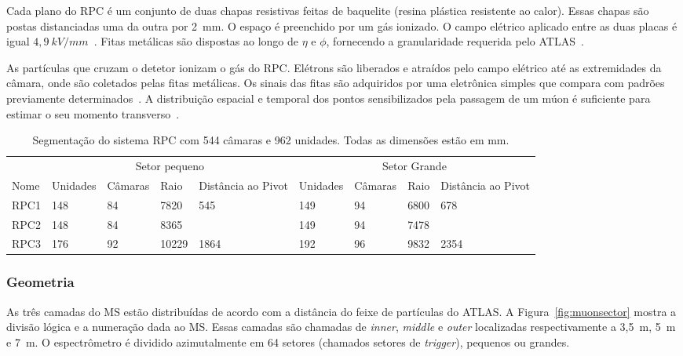 Cada plano do RPC é um conjunto de duas chapas resistivas feitas de baquelite
(resina plástica resistente ao calor). Essas chapas são postas distanciadas uma
da outra por 2~mm. O espaço é preenchido por um gás ionizado. O campo
elétrico aplicado entre as duas placas é igual $ 4,9~kV/mm$~\cite{ATLAS2008}.
Fitas metálicas são dispostas ao longo de $\eta$ e $\phi$, fornecendo a
granularidade requerida pelo ATLAS~\cite{MUONTDR1997, POLINI2012}.

As partículas que cruzam o detetor ionizam o gás do RPC. Elétrons são liberados
e atraídos pelo campo elétrico até as extremidades da câmara, onde são coletados
pelas fitas metálicas. Os sinais das fitas são adquiridos por uma eletrônica
simples que compara com padrões previamente determinados~\cite{MUONTDR1997}. A
distribuição espacial e temporal dos pontos sensibilizados pela passagem de um
múon é suficiente para estimar o seu momento transverso~\cite{ANULLI2009}.

\begin{table}[htbp!]\footnotesize
  \centering
  \tabcolsep=0.08cm
  \begin{tabular}{ m{1.5cm}   m{1.5cm}  m{1.5cm}  m{1.5cm}  m{1.5cm} m{1.5cm} m{1.5cm}  m{1.5cm}  m{1.5cm}  }
       \multicolumn{1}{c}{}& \multicolumn{4}{c}{Setor pequeno}& \multicolumn{4}{c}{Setor Grande} \\
        \cmidrule(r){2-5}
        \cmidrule(r){6-9}
      Nome & Unidades & Câmaras & Raio & Distância ao Pivot & Unidades & Câmaras & Raio & Distância ao Pivot \\
      \midrule
      RPC1 & 148 & 84 & 7820  & 545  & 149 & 94 & 6800 & 678 \\
      RPC2 & 148 & 84 & 8365  &      & 149 & 94 & 7478 &     \\
      RPC3 & 176 & 92 & 10229 & 1864 & 192 & 96 & 9832 & 2354\\
      \bottomrule
  \end{tabular}
  \caption{Segmentação do sistema RPC com 544 câmaras e 962 unidades. Todas as
  dimensões estão em mm.}
  \label{table:rpc_segmentation}

\end{table}
\subsubsection*{Geometria}

As três camadas do MS estão distribuídas de acordo com a distância do feixe de
partículas do ATLAS. A Figura~\ref{fig:muonsector} mostra a divisão lógica e a
numeração dada ao MS. Essas camadas são chamadas de \emph{inner}, \emph{middle}
e \emph{outer} localizadas respectivamente a 3,5~m, 5~m e 7~m. O espectrômetro
é dividido azimutalmente em 64 setores (chamados setores de \emph{trigger}),
pequenos ou grandes.


